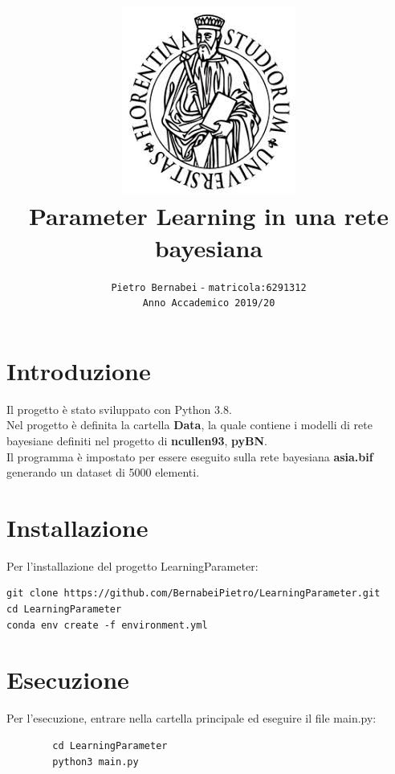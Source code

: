 \documentclass[14pt]{extarticle}
\begin{document}
\title{\includegraphics{download.jpeg} \vspace{2cm} \textbf{\\Parameter Learning in una rete bayesiana}}

\author{\texttt{Pietro Bernabei} - \texttt{matricola:6291312}\\ \texttt{Anno Accademico 2019/20}}
\date{}
\maketitle

\newpage
\section{Introduzione}
	Il progetto è stato sviluppato con Python 3.8.\\
	Nel  progetto è definita la cartella \textbf{Data}, la quale contiene  i modelli di rete bayesiane definiti nel progetto di \textbf{ncullen93}, \textbf{pyBN}. \\
	Il programma è impostato per essere eseguito sulla rete bayesiana \textbf{asia.bif} generando un dataset di 5000 elementi.
	\section{Installazione}	
Per l'installazione del progetto LearningParameter:
\begin{lstlisting}
git clone https://github.com/BernabeiPietro/LearningParameter.git
cd LearningParameter
conda env create -f environment.yml
\end{lstlisting} 
	
	 \section{Esecuzione}
Per l'esecuzione, entrare nella cartella principale ed eseguire il file main.py:
		\begin{lstlisting}
		cd LearningParameter
		python3 main.py
		\end{lstlisting}
		
\end{document}
